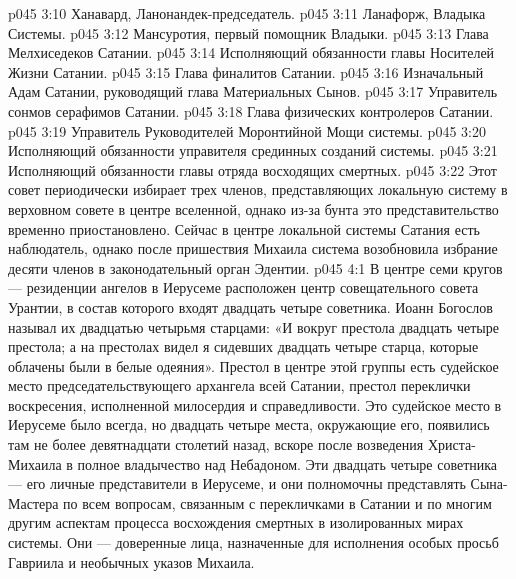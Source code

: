 \vs p045 3:10 \bibnobreakspace Ханавард, Ланонандек\hyp{}председатель.
\vs p045 3:11 \bibnobreakspace Ланафорж, Владыка Системы.
\vs p045 3:12 \bibnobreakspace Мансуротия, первый помощник Владыки.
\vs p045 3:13 \bibnobreakspace Глава Мелхиседеков Сатании.
\vs p045 3:14 \bibnobreakspace Исполняющий обязанности главы Носителей Жизни Сатании.
\vs p045 3:15 \bibnobreakspace Глава финалитов Сатании.
\vs p045 3:16 \bibnobreakspace Изначальный Адам Сатании, руководящий глава Материальных Сынов.
\vs p045 3:17 \bibnobreakspace Управитель сонмов серафимов Сатании.
\vs p045 3:18 \bibnobreakspace Глава физических контролеров Сатании.
\vs p045 3:19 \bibnobreakspace Управитель Руководителей Моронтийной Мощи системы.
\vs p045 3:20 \bibnobreakspace Исполняющий обязанности управителя срединных созданий системы.
\vs p045 3:21 \bibnobreakspace Исполняющий обязанности главы отряда восходящих смертных.
\vs p045 3:22 \pc Этот совет периодически избирает трех членов, представляющих локальную систему в верховном совете в центре вселенной, однако из\hyp{}за бунта это представительство временно приостановлено. Сейчас в центре локальной системы Сатания есть наблюдатель, однако после пришествия Михаила система возобновила избрание десяти членов в законодательный орган Эдентии.
\vs p045 4:1 В центре семи кругов --- резиденции ангелов в Иерусеме расположен центр совещательного совета Урантии, в состав которого входят двадцать четыре советника. Иоанн Богослов называл их двадцатью четырьмя старцами: «И вокруг престола двадцать четыре престола; а на престолах видел я сидевших двадцать четыре старца, которые облачены были в белые одеяния». Престол в центре этой группы есть судейское место председательствующего архангела всей Сатании, престол переклички воскресения, исполненной милосердия и справедливости. Это судейское место в Иерусеме было всегда, но двадцать четыре места, окружающие его, появились там не более девятнадцати столетий назад, вскоре после возведения Христа\hyp{}Михаила в полное владычество над Небадоном. Эти двадцать четыре советника --- его личные представители в Иерусеме, и они полномочны представлять Сына\hyp{}Мастера по всем вопросам, связанным с перекличками в Сатании и по многим другим аспектам процесса восхождения смертных в изолированных мирах системы. Они --- доверенные лица, назначенные для исполнения особых просьб Гавриила и необычных указов Михаила.
